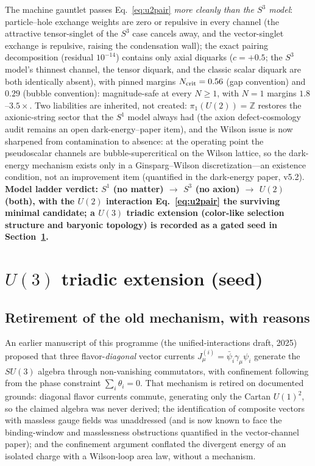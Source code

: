 \documentclass[11pt,a4paper]{article}
\begin{document}
The machine gauntlet passes Eq.~\eqref{eq:u2pair} \emph{more
cleanly than the $S^3$ model}: particle--hole exchange weights are
zero or repulsive in every channel (the attractive tensor-singlet
of the $S^3$ case cancels away, and the vector-singlet exchange is
repulsive, raising the condensation wall); the exact pairing
decomposition (residual $10^{-14}$) contains only axial diquarks
($c = +0.5$; the $S^3$ model's thinnest channel, the tensor
diquark, and the classic scalar diquark are both identically
absent), with pinned margins $N_{\rm crit} = 0.56$ (gap
convention) and $0.29$ (bubble convention): magnitude-safe at
every $N \geq 1$, with $N=1$ margins $1.8$--$3.5\times$.
Two liabilities are inherited, not created: $\pi_1(U(2)) =
\mathbb{Z}$ restores the axionic-string sector that the $S^1$
model always had (the axion defect-cosmology audit remains an
open dark-energy--paper item), and the Wilson issue is now sharpened from contamination to
absence: at the operating point the pseudoscalar channels are
bubble-supercritical on the Wilson lattice, so the dark-energy
mechanism exists only in a Ginsparg--Wilson discretization---an
existence condition, not an improvement item (quantified in the
dark-energy paper, v5.2).
\textbf{Model ladder verdict: $S^1$ (no matter) $\to$ $S^3$ (no
axion) $\to$ $U(2)$ (both), with the $U(2)$ interaction
Eq.~\eqref{eq:u2pair} the surviving minimal candidate; a $U(3)$
triadic extension (color-like selection structure and baryonic
topology) is recorded as a gated seed in
Section~\ref{sec:u3seed}.}


\section{$U(3)$ triadic extension (seed)}
\label{sec:u3seed}

\subsection*{Retirement of the old mechanism, with reasons}
An earlier manuscript of this programme (the unified-interactions
draft, 2025) proposed that three flavor-\emph{diagonal} vector
currents $J^{(i)}_\mu = \bar\psi_i\gamma_\mu\psi_i$ generate the
$SU(3)$ algebra through non-vanishing commutators, with
confinement following from the phase constraint
$\sum_i\theta_i = 0$.  That mechanism is retired on documented
grounds: diagonal flavor currents commute, generating only the
Cartan $U(1)^2$, so the claimed algebra was never derived; the
identification of composite vectors with massless gauge fields
was unaddressed (and is now known to face the binding-window and
masslessness obstructions quantified in the vector-channel
paper); and the confinement argument conflated the divergent
energy of an isolated charge with a Wilson-loop area law, without
a mechanism.
\end{document}
